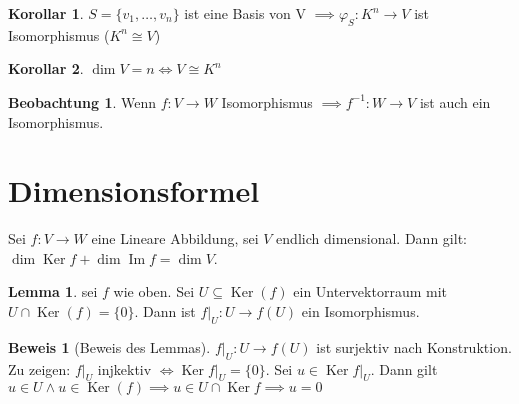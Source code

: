 \documentclass[oneside,fontsize=11pt,paper=a4,BCOR=0mm,DIV=12,automark,headsepline]{scrbook}
\DeclareMathOperator{\mdim}{dim}
\DeclareMathOperator{\mKer}{Ker}
\DeclareMathOperator{\mIm}{Im}
\theoremstyle{remark}
\theoremstyle{definition}
\newtheorem{beobachtung}{Beobachtung}
\newtheorem{lemma}{Lemma}[section]
\newtheorem*{korollar}{Korollar}
\theoremstyle{definition}
\newtheorem*{prof}{Beweis}
\theoremstyle{remark}
\begin{document}
\begin{korollar}
  \(S=\{v_1,\ldots,v_n\}\) ist eine Basis von V $\implies \varphi_S: K^n \rightarrow V$ ist Isomorphismus ($K^n\cong V$)
\end{korollar}

\begin{korollar}
  \(\dim V = n \iff V\cong K^n\)
\end{korollar}

\begin{beobachtung}
  Wenn \(f:V\rightarrow W\) Isomorphismus $\implies f^{-1}:W\rightarrow V $ ist auch ein Isomorphismus.
\end{beobachtung}

\section{Dimensionsformel}
\label{sec:org9a58004}
\begin{theo}{}{}
  Sei \(f:V\to W\) eine Lineare Abbildung, sei \(V\) endlich dimensional. Dann gilt: \(\mdim\mKer f + \mdim\mIm f = \mdim V\).
\end{theo}

\begin{lemma} sei \(f\) wie oben. Sei \(U \subseteq \mKer(f)\) ein Untervektorraum mit \(U \cap \mKer(f) = \{0\}\).  Dann ist \(f|_U:U\to f(U)\) ein Isomorphismus.
\end{lemma}

\begin{prof}[Beweis des Lemmas]
  \(f|_U:U\to f(U)\) ist surjektiv nach Konstruktion. Zu zeigen: \(f|_U\) injkektiv \(\iff \mKer f|_U = \{0\}\). Sei \(u\in \mKer f|_U \). Dann gilt \(u\in U \land u \in \mKer(f) \implies u \in U \cap \mKer f \implies u = 0\)
\end{prof}
\end{document}
